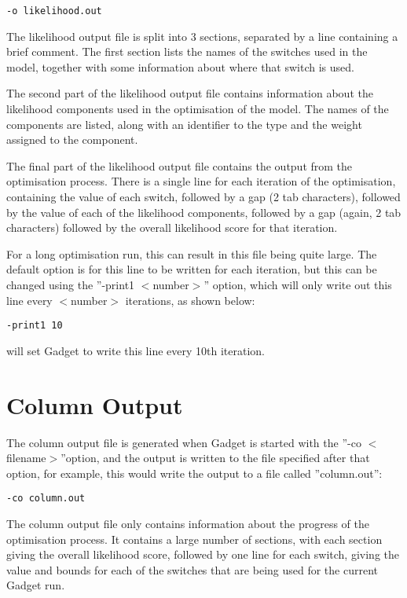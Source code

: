 \documentclass [a4paper, 10pt]{book}
\begin{document}
\begin{verbatim}
-o likelihood.out
\end{verbatim}

The likelihood output file is split into 3 sections, separated by a line containing a brief comment.  The first section lists the names of the switches used in the model, together with some information about where that switch is used.

\bigskip
The second part of the likelihood output file contains information about the likelihood components used in the optimisation of the model.  The names of the components are listed, along with an identifier to the type and the weight assigned to the component.

\bigskip
The final part of the likelihood output file contains the output from the optimisation process.  There is a single line for each iteration of the optimisation, containing the value of each switch, followed by a gap (2 tab characters), followed by the value of each of the likelihood components, followed by a gap (again, 2 tab characters) followed by the overall likelihood score for that iteration.

\bigskip
For a long optimisation run, this can result in this file being quite large.  The default option is for this line to be written for each iteration, but this can be changed using the ''-print1 $<$number$>$'' option, which will only write out this line every $<$number$>$ iterations, as shown below:

\begin{verbatim}
-print1 10
\end{verbatim}

will set Gadget to write this line every 10th iteration.

\section{Column Output}\label{sec:columnoutput}
The column output file is generated when Gadget is started with the ''-co $<$filename$>$''option, and the output is written to the file specified after that option, for example, this would write the output to a file called ''column.out'':

\begin{verbatim}
-co column.out
\end{verbatim}

The column output file only contains information about the progress of the optimisation process.  It contains a large number of sections, with each section giving the overall likelihood score, followed by one line for each switch, giving the value and bounds for each of the switches that are being used for the current Gadget run.
\end{document}

